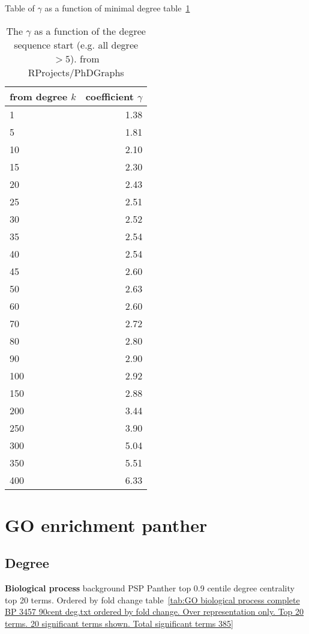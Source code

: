 Table of $\gamma$ as a function of minimal degree table~\ref{table:gamma}
\begin{table}[ht]
\centering
\begin{tabular}{lr}
  \hline
  from degree $k$ & coefficient $\gamma$ \\ 
  \hline
1 & 1.38 \\ 
  5 & 1.81 \\ 
  10 & 2.10 \\ 
  15 & 2.30 \\ 
  20 & 2.43 \\ 
  25 & 2.51 \\ 
   30 & 2.52 \\ 
  35 & 2.54 \\ 
   40 & 2.54 \\ 
   45 & 2.60 \\ 
  50 & 2.63 \\ 
   60 & 2.60 \\ 
   70 & 2.72 \\ 
   80 & 2.80 \\ 
   90 & 2.90 \\ 
   100 & 2.92 \\ 
  150 & 2.88 \\ 
   200 & 3.44 \\ 
   250 & 3.90 \\ 
  300 & 5.04 \\ 
   350 & 5.51 \\ 
   400 & 6.33 \\ 
   \hline
\end{tabular}
\caption{The $\gamma$ as a function of the degree sequence start (e.g. all degree $>5$). from RProjects/PhDGraphs}
  \label{table:gamma}
\end{table}


\section{GO enrichment panther}

\subsection{Degree}


\textbf{Biological process} background PSP Panther top 0.9 centile degree centrality top 20 terms. Ordered by fold change table~\ref{tab:GO biological process complete BP 3457 90cent deg.txt ordered by fold change. Over representation only. Top 20 terms. 20 significant terms shown. Total significant terms 385}

